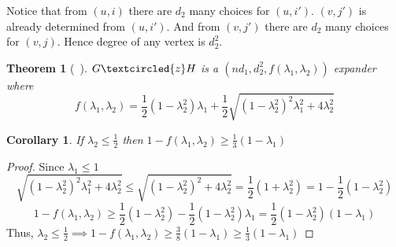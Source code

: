 \documentclass[10pt]{article}
\theoremstyle{plain}
\newtheorem{theorem}{Theorem}[section]
\newtheorem{corollary}{Corollary}[theorem]
\theoremstyle{definition}
\begin{document}
\begin{center}
\end{center}

Notice that from $(u,i)$ there are $d_2$ many choices for $(u,i')$. $(v,j')$ is already determined from $(u,i')$. And from $(v,j')$ there are $d_2$ many choices for $(v,j)$. Hence degree of any vertex is $d_2^2$.

\begin{theorem}[~\cite{DBLP:journals/eccc/ECCC-TR01-018}]
$G \textcircled{z} H$ is a $(nd_1, d_2^2, f(\lambda_1, \lambda_2))$ expander where $$f(\lambda_1, \lambda_2) = \frac12 (1 - \lambda_2^2)\lambda_1 + \frac12 \sqrt{(1 - \lambda_2^2)^2\lambda_1^2 + 4\lambda_2^2}$$
\end{theorem}

\begin{corollary}
If $\lambda_2 \leq \frac12$ then $1-f(\lambda_1, \lambda_2) \geq \frac13(1-\lambda_1)$
\end{corollary}

\begin{proof}
Since $\lambda_1 \leq 1$
$$\sqrt{(1 - \lambda_2^2)^2\lambda_1^2 + 4\lambda_2^2} \leq \sqrt{(1 - \lambda_2^2)^2 + 4\lambda_2^2} = \frac12 (1 + \lambda_2^2) = 1 - \frac12 (1 - \lambda_2^2)$$
$$1 - f(\lambda_1, \lambda_2) \geq \frac12 (1 - \lambda_2^2) - \frac12 (1 - \lambda_2^2)\lambda_1 = \frac12 (1 - \lambda_2^2)(1-\lambda_1)$$
Thus, $\lambda_2 \leq \frac12 \implies 1 - f(\lambda_1, \lambda_2)\geq  \frac38( 1- \lambda_1) \geq \frac13( 1- \lambda_1)$
\end{proof}
\end{document}
